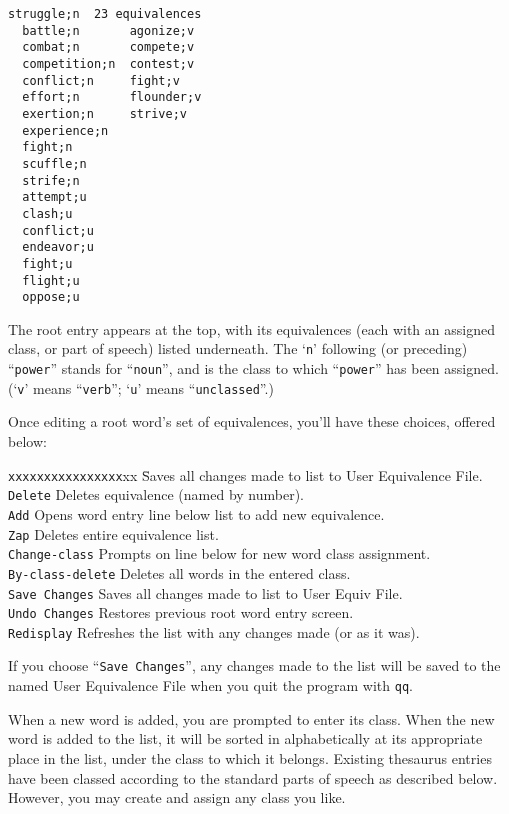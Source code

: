\begin{screen}
\begin{verbatim}
struggle;n  23 equivalences
  battle;n       agonize;v
  combat;n       compete;v
  competition;n  contest;v
  conflict;n     fight;v
  effort;n       flounder;v
  exertion;n     strive;v
  experience;n
  fight;n
  scuffle;n
  strife;n
  attempt;u
  clash;u
  conflict;u
  endeavor;u
  fight;u
  flight;u
  oppose;u
\end{verbatim}
\end{screen}

The root entry appears at the top, with its equivalences (each with an
assigned class, or part of speech) listed underneath.  The `\verb`n`'
following (or preceding) ``\verb`power`'' stands for ``\verb`noun`'',
and is the class to which ``\verb`power`'' has been assigned.
(`\verb`v`' means ``\verb`verb`''; `\verb`u`' means
``\verb`unclassed`''.)

Once editing a root word's set of equivalences, you'll have these
choices, offered below:

\begin{tabbing}
\verb`xxxxxxxxxxxxxxxx`xx \= Saves all changes made to list to User Equivalence File. \kill
          \verb`Delete` \> Deletes equivalence (named by number).                   \\
             \verb`Add` \> Opens word entry line below list to add new equivalence. \\
             \verb`Zap` \> Deletes entire equivalence list.                         \\
    \verb`Change-class` \> Prompts on line below for new word class assignment.     \\
 \verb`By-class-delete` \> Deletes all words in the entered class.                  \\
    \verb`Save Changes` \> Saves all changes made to list to User Equiv File.      \\
    \verb`Undo Changes` \> Restores previous root word entry screen.                \\
       \verb`Redisplay` \> Refreshes the list with any changes made (or as it was).   \\
\end{tabbing}

If you choose ``\verb`Save Changes`'', any changes made to the
list will be saved to the named User Equivalence File when you
quit the program with \verb`qq`.

When a new word is added, you are prompted to enter its class.  When
the new word is added to the list, it will be sorted in alphabetically
at its appropriate place in the list, under the class to which it
belongs.  Existing thesaurus entries have been classed according to
the standard parts of speech as described below.  However, you may
create and assign any class you like.


